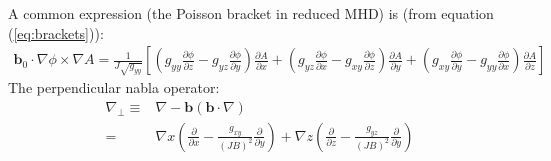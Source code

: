 \documentclass[12pt]{article}
\def\L{\left}
\def\R{\right}
\newcommand{\deriv}[2]{\ensuremath{\frac{\partial #1}{\partial #2}}}
\newcommand{\ve}[1]{\ensuremath{\boldsymbol{#1}}}
\newcommand{\bvec}{\ve{b}}
\begin{document}
%
A common expression (the Poisson bracket in reduced MHD) is (from equation
(\ref{eq:brackets})):
%
\begin{align*}
\bvec_0\cdot\nabla\phi\times\nabla A =
\frac{1}{J\sqrt{g_{yy}}}\L[\L(g_{yy}\deriv{\phi}{z} -
    g_{yz}\deriv{\phi}{y}\R)\deriv{A}{x} + \L(g_{yz}\deriv{\phi}{x} -
    g_{xy}\deriv{\phi}{z}\R)\deriv{A}{y} + \L(g_{xy}\deriv{\phi}{y} -
g_{yy}\deriv{\phi}{x}\R)\deriv{A}{z}\R]
\end{align*}
%
The perpendicular nabla operator:
%
\begin{align*}
\nabla_\perp \equiv& \nabla - \ve{b}\L(\ve{b}\cdot\nabla\R) \\ =& \nabla
    x\L(\deriv{}{x} - \frac{g_{xy}}{\L(JB\R)^2}\deriv{}{y}\R) +
    \nabla z\L(\deriv{}{z} -
    \frac{g_{yz}}{\L(JB\R)^2}\deriv{}{y}\R)
\end{align*}
%
\end{document}
